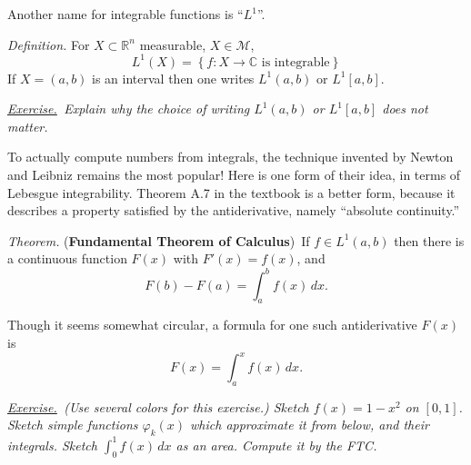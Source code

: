 \documentclass[12pt]{article}
\newcommand{\cM}{\mathcal{M}}
\newcommand{\CC}{\mathbb{C}}
\newcommand{\RR}{\mathbb{R}}
\newcommand{\defin}{\emph{Definition.}\,\,}
\newcommand{\thm}{\emph{Theorem.}\,\,}
\newcommand{\exer}[2]{\emph{\underline{Exercise.}\, #2} \vspace*{#1mm}}
\begin{document}
Another name for integrable functions is ``$L^1$''.

\defin For $X \subset \RR^n$ measurable, $X\in\cM$,
	$$L^1(X) = \left\{f:X\to\CC \text{ is integrable}\right\}$$
If $X=(a,b)$ is an interval then one writes $L^1(a,b)$ or $L^1[a,b]$.

\exer{30}{Explain why the choice of writing $L^1(a,b)$ or $L^1[a,b]$ does not matter.}

To actually compute numbers from integrals, the technique invented by Newton and Leibniz remains the most popular!  Here is one form of their idea, in terms of Lebesgue integrability.  Theorem A.7 in the textbook is a better form, because it describes a property satisfied by the antiderivative, namely ``absolute continuity.''

\thm (\textbf{Fundamental Theorem of Calculus})\,  If $f \in L^1(a,b)$ then there is a continuous function $F(x)$ with $F'(x)=f(x)$, and
    $$F(b) - F(a) = \int_a^b f(x)\,dx.$$

Though it seems somewhat circular, a formula for one such antiderivative $F(x)$ is
    $$F(x) = \int_a^x f(x)\,dx.$$

\exer{60}{(Use several colors for this exercise.)  Sketch $f(x)=1-x^2$ on $[0,1]$.  Sketch simple functions $\varphi_k(x)$ which approximate it from below, and their integrals.  Sketch $\int_0^1 f(x)\,dx$ as an area.  Compute it by the FTC.}
\end{document}

